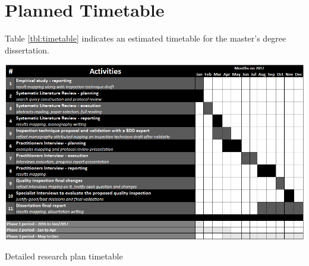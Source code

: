\section{Planned Timetable}

Table \ref{tbl:timetable} indicates an estimated timetable for the master's degree dissertation.

\begin{table}[!h]
\centering
\includegraphics[scale=0.65]{images/Planning-Table}
\caption{Detailed research plan timetable}
\label{tbl:timetable}
\end{table}
